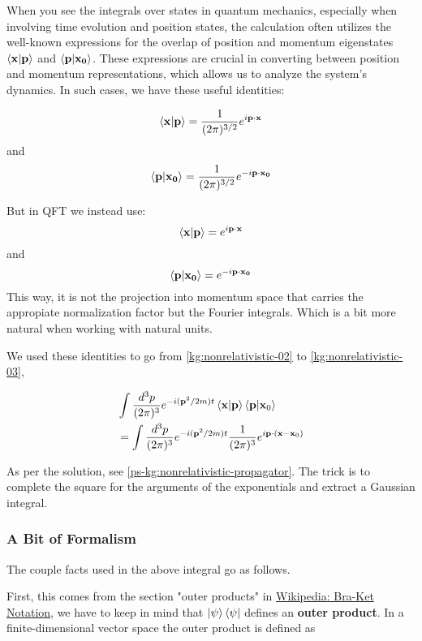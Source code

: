 When you see the integrals over states in quantum mechanics, especially when involving time evolution and position states,
the calculation often utilizes the well-known expressions for the overlap of position and momentum eigenstates
$\braket{\boldsymbol{\mathbf{x}} | \boldsymbol{\mathbf{p}}}$ and $\braket{\boldsymbol{\mathbf{p}} | \boldsymbol{\mathbf{x_0}}}$.
These expressions are crucial in converting between position and momentum representations,
which allows us to analyze the system's dynamics.
In such cases, we have these useful identities:

$$
\braket{\boldsymbol{\mathbf{x}} | \boldsymbol{\mathbf{p}}} = \frac{1}{(2\pi)^{3/2}} e^{i\boldsymbol{\mathbf{p}}\cdot\boldsymbol{\mathbf{x}}}
$$
and 
$$
\braket{\boldsymbol{\mathbf{p}} | \boldsymbol{\mathbf{x_0}}} = \frac{1}{(2\pi)^{3/2}} e^{-i\boldsymbol{\mathbf{p}}\cdot\boldsymbol{\mathbf{x_0}}}
$$

But in QFT we instead use:
$$
\braket{\boldsymbol{\mathbf{x}} | \boldsymbol{\mathbf{p}}} = e^{i\boldsymbol{\mathbf{p}}\cdot\boldsymbol{\mathbf{x}}}
$$
and 
$$
\braket{\boldsymbol{\mathbf{p}} | \boldsymbol{\mathbf{x_0}}} = e^{-i\boldsymbol{\mathbf{p}}\cdot\boldsymbol{\mathbf{x_0}}}
$$
This way, it is not the projection into momentum space that carries the appropiate normalization factor
but the Fourier integrals.
Which is a bit more natural when working with natural units.


We used these identities to go from \ref{kg:nonrelativistic-02} to \ref{kg:nonrelativistic-03},

\begin{align*}
& \int \frac{d^3p}{(2\pi)^3} e^{-i(\boldsymbol{\mathbf{p}}^2/2m)t} \braket{\boldsymbol{\mathbf{x}} | \boldsymbol{\mathbf{p}}} \braket{\boldsymbol{\mathbf{p}} | \boldsymbol{\mathbf{x}}_0} \\
&= \int \frac{d^3p}{(2\pi)^3} e^{-i(\boldsymbol{\mathbf{p}}^2/2m)t} \frac{1}{(2\pi)^3} e^{i\boldsymbol{\mathbf{p}}\cdot(\boldsymbol{\mathbf{x}}-\boldsymbol{\mathbf{x}}_0)} 
\end{align*}


As per the solution, see \ref{ps-kg:nonrelativistic-propagator}.
The trick is to complete the square for the arguments of the exponentials and extract a Gaussian integral.


\subsubsection{A Bit of Formalism}

The couple facts used in the above integral go as follows.

First, this comes from the section "outer products" in
\href{https://en.wikipedia.org/wiki/Bra%E2%80%93ket_notation}{Wikipedia: Bra-Ket Notation},
we have to keep in mind that $\ket{\psi}\bra{\psi}$ defines an \textbf{outer product}.
In a finite-dimensional vector space the outer product is defined as

